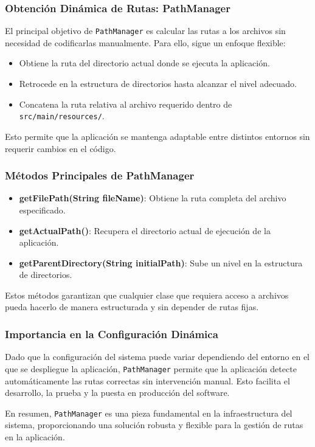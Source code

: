 \documentclass[draft]{scrbook}
\begin{document}
\subsubsection{Obtención Dinámica de Rutas: PathManager}
El principal objetivo de \texttt{PathManager} es calcular las rutas a los archivos sin necesidad de codificarlas manualmente. Para ello, sigue un enfoque flexible:
\begin{itemize}
    \item Obtiene la ruta del directorio actual donde se ejecuta la aplicación.
    \item Retrocede en la estructura de directorios hasta alcanzar el nivel adecuado.
    \item Concatena la ruta relativa al archivo requerido dentro de \texttt{src/main/resources/}.
\end{itemize}
Esto permite que la aplicación se mantenga adaptable entre distintos entornos sin requerir cambios en el código.

\subsubsection{Métodos Principales de PathManager}
\begin{itemize}
    \item \textbf{getFilePath(String fileName)}: Obtiene la ruta completa del archivo especificado.
    \item \textbf{getActualPath()}: Recupera el directorio actual de ejecución de la aplicación.
    \item \textbf{getParentDirectory(String initialPath)}: Sube un nivel en la estructura de directorios.
\end{itemize}
Estos métodos garantizan que cualquier clase que requiera acceso a archivos pueda hacerlo de manera estructurada y sin depender de rutas fijas.

\subsubsection{Importancia en la Configuración Dinámica}
Dado que la configuración del sistema puede variar dependiendo del entorno en el que se despliegue la aplicación, \texttt{PathManager} permite que la aplicación detecte automáticamente las rutas correctas sin intervención manual. Esto facilita el desarrollo, la prueba y la puesta en producción del software.

En resumen, \texttt{PathManager} es una pieza fundamental en la infraestructura del sistema, proporcionando una solución robusta y flexible para la gestión de rutas en la aplicación.
\end{document}
